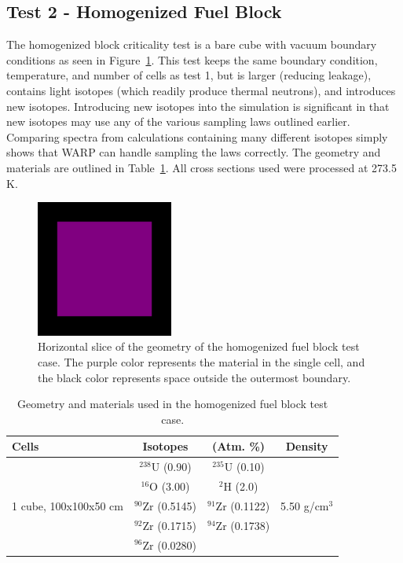 \documentclass[preprint,12pt]{elsarticle}
\begin{document}
\newpage
\subsection{Test 2 - Homogenized Fuel Block}

The homogenized block criticality test is a bare cube with vacuum boundary conditions as seen in Figure~\ref{homfuel_geom_pic}.  This test keeps the same boundary condition, temperature, and number of cells as test 1, but is larger (reducing leakage), contains light isotopes (which readily produce thermal neutrons), and introduces new isotopes.  Introducing new isotopes into the simulation is significant in that new isotopes may use any of the various sampling laws outlined earlier.  Comparing spectra from calculations containing many different isotopes simply shows that WARP can handle sampling the laws correctly.  The geometry and materials are outlined in Table~\ref{homfuel_geom}.  All cross sections used were processed at 273.5 K.

\begin{figure}[h!] 
  \centering
    \includegraphics[width=0.4\textwidth]{graphics/homfuel-xy.png}
     \caption{ Horizontal slice of the geometry of the homogenized fuel block test case.  The purple color represents the material in the single cell, and the black color represents space outside the outermost boundary. \label{homfuel_geom_pic} }
\end{figure}

\begin{table}[h]
\centering
\caption{Geometry and materials used in the homogenized fuel block test case.}
\label{homfuel_geom}
\begin{tabular}{| l | c  c | c |}
\hline
Cells & Isotopes & (Atm. \%)& Density \\
\hline
\multirow{5}{*}{1 cube, 100x100x50 cm }            &   $^{238}$U   (0.90)   &  $^{235}$U   (0.10)   &  \multirow{5}{*}{5.50 g/cm$^3$} \\
                                                   &   $^{16}$O    (3.00)   &  $^{2}$H     (2.0)    &  \\
                                                   &   $^{90}$Zr   (0.5145) &  $^{91}$Zr   (0.1122) &  \\
                                                   &   $^{92}$Zr   (0.1715) &  $^{94}$Zr   (0.1738) &  \\
                                                   &   $^{96}$Zr   (0.0280) &                       &  \\
\hline
\end{tabular}
\end{table}
\end{document}
